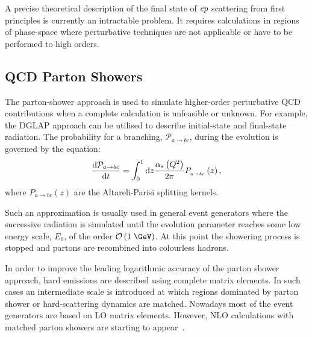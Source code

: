 A precise theoretical description of the final state of $\mbox{$e p$}$ scattering from first principles is currently an intractable problem. It requires calculations in regions of phase-space where perturbative techniques are not applicable or have to be performed to high orders.
\subsection{QCD Parton Showers}
The parton-shower approach is used to simulate higher-order perturbative QCD contributions when a complete calculation is unfeasible or unknown. For example, the DGLAP approach can be utilised to describe initial-state and final-state radiation. The probability for a branching, $\mathcal{P}_{a\rightarrow bc}$, during the evolution is governed by the equation:
\begin{equation}
\frac{\mathrm{d}\mathcal{P}_{a\rightarrow bc}}{\mathrm{d}t} = \int_0^1{\mathrm{d}z\frac{\mbox{$\alpha_{s}$}\left(\mbox{${Q^2}$}\right)}{2\pi}P_{_{a\rightarrow bc}}}\left(z\right),
\end{equation}
where $P_{a\rightarrow bc}\left(z\right)$ are the Altareli-Parisi splitting kernels.

Such an approximation is usually used in general event generators where the successive radiation is simulated until the evolution parameter reaches some low energy scale, $E_0$, of the order $\mathcal{O}\left(1\;\GeV\right)$. At this point the showering process is stopped and partons are recombined into colourless hadrons.

In order to improve the leading logarithmic accuracy of the parton shower approach, hard emissions are described using complete matrix elements. In such cases an intermediate scale is introduced at which regions dominated by parton shower or hard-scattering dynamics are matched. Nowadays most of the event generators are based on LO matrix elements. However, NLO calculations with matched parton showers are starting to appear~\cite{powheg, mcatnlo}.


